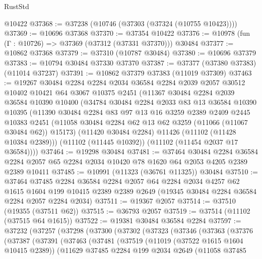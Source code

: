 \begin{lexlean}{RustStd}
\begin{coremodule}
    @10422
@37368 := @37238 (@10746 (@37303 (@37324 (@10755 @10423))))
@37369 := @10696 @37368
@37370 := @37354 @10422
@37376 := @10978 (fun (Γ : @10726) => @37369 (@37312 (@37331 @37370))) @30484
@37377 := @10862 @37368
@37379 := @37310 (@10787 @30484)
@37380 := @10696 @37379
@37383 := @10794 @30484 @37330 @37370
@37387 := @37377 (@37380 @37383) (@11014 @37237)
@37391 := @10862 @37379 @37383 (@11019 @37309)
@37463 := @19267
    @30484
    @2284
    @2284
    @2034
    @36584
    @2284
    @2039
    @2057
    @30512
    @10402
    @10421
    @64
    @3067
    @10375
    @2451
    (@11367
      @30484
      @2284
      @2039
      @36584
      @10390
      @10400
      (@34784
        @30484
        @2284
        @2033
        @83
        @13
        @36584
        @10390
        @10395
        (@11390
          @30484
          @2284
          @83
          @97
          @13
          @16
          @3259
          @2389
          @2409
          @2445
          @10383
          @2451
          (@11058 @30484 @2284 @62 @13 @62 @3259 (@11066 (@11067 @30484 @62)) @15173)
          (@11420 @30484 @2284)
          @11426
          (@11102 (@11428 @10384 @2389)))
        (@11102 (@11445 @10392))
        (@11102 (@11454 @2037 @17 @36584))))
@37464 := @19298 @30484
@37481 := @37464
    @30484
    @2284
    @36584
    @2284
    @2057
    @65
    @2284
    @2034
    @10420
    @78
    @1620
    @64
    @2053
    @4205
    @2389
    @2389
    @10411
@37485 := @10991 (@11323 (@36761 @11325)) @30484
@37510 := @37464
    @37485
    @2284
    @36584
    @2284
    @2057
    @64
    @2284
    @2034
    @4257
    @62
    @1615
    @1604
    @199
    @10415
    @2389
    @2389
    @2649
    (@19345 @30484 @2284 @36584 @2284 @2057 @2284 @2034)
@37511 := @19367 @2057
@37514 := @37510 (@19355 (@37511 @62))
@37515 := @36793 @2057
@37519 := @37514 (@11102 (@37515 @64 @1615))
@37522 := @19381 @30484 @36584 @2284
@37597 := @37232
    (@37257
      (@37298
        (@37300
          (@37302
            (@37323
              (@37346
                (@37363
                  (@37376
                    (@37387
                      (@37391
                        (@37463
                          (@37481
                            (@37519
                              (@11019 (@37522 @1615 @1604 @10415 @2389))
                              (@11629
                                @37485
                                @2284
                                @199
                                @2034
                                @2649
                                (@11058
                                  @37485

\end{coremodule}
\end{lexlean}
